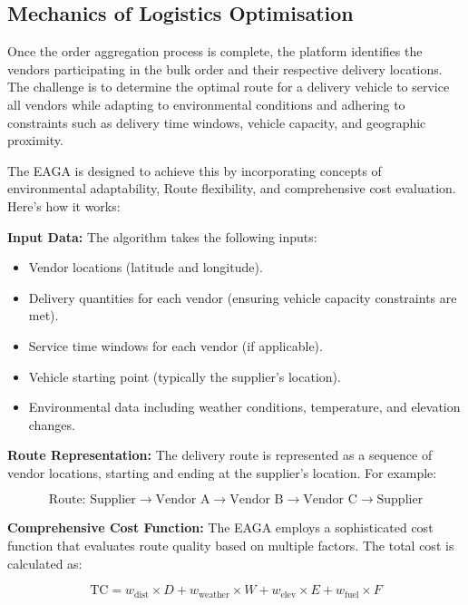 \subsection{Mechanics of Logistics Optimisation}

Once the order aggregation process is complete, the platform identifies the vendors participating in the bulk order and their respective delivery locations. The challenge is to determine the optimal route for a delivery vehicle to service all vendors while adapting to environmental conditions and adhering to constraints such as delivery time windows, vehicle capacity, and geographic proximity.

The EAGA is designed to achieve this by incorporating concepts of environmental adaptability, Route flexibility, and comprehensive cost evaluation. Here's how it works:

\textbf{Input Data:}
The algorithm takes the following inputs:
\begin{itemize}
    \item Vendor locations (latitude and longitude).
    \item Delivery quantities for each vendor (ensuring vehicle capacity constraints are met).
    \item Service time windows for each vendor (if applicable).
    \item Vehicle starting point (typically the supplier's location).
    \item Environmental data including weather conditions, temperature, and elevation changes.
\end{itemize}

\textbf{Route Representation:}
The delivery route is represented as a sequence of vendor locations, starting and ending at the supplier's location. For example:

\[
    \text{Route: Supplier} \rightarrow \text{Vendor A} \rightarrow \text{Vendor B} \rightarrow \text{Vendor C} \rightarrow \text{Supplier}
\]

\textbf{Comprehensive Cost Function:}
The EAGA employs a sophisticated cost function that evaluates route quality based on multiple factors. The total cost is calculated as:

\begin{equation}
    \text{TC} = w_{\text{dist}} \times D + w_{\text{weather}} \times W + w_{\text{elev}} \times E + w_{\text{fuel}} \times F
\end{equation}

